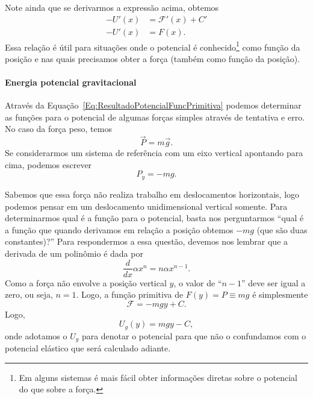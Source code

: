 Note ainda que se derivarmos a expressão acima, obtemos
\begin{align}
    - U'(x) &= \mathcal{F}'(x) + C' \\
    - U'(x) &= F(x). \label{Eq:ForcaGradPot}
\end{align}
%
Essa relação é útil para situações onde o potencial é conhecido\footnote{Em alguns sistemas é mais fácil obter informações diretas sobre o potencial do que sobre a força.} como função da posição e nas quais precisamos obter a força (também como função da posição).

\paragraph{Energia potencial gravitacional}

Através da Equação~\eqref{Eq:ResultadoPotencialFuncPrimitiva} podemos determinar as funções para o potencial de algumas forças simples através de tentativa e erro. No caso da força peso, temos
\begin{equation}
    \vec{P} = m\vec{g}.
\end{equation}
%
Se considerarmos um sistema de referência com um eixo vertical apontando para cima, podemos escrever
\begin{equation}
    P_y = -mg.
\end{equation}

Sabemos que essa força não realiza trabalho em deslocamentos horizontais, logo podemos pensar em um deslocamento unidimensional vertical somente. Para determinarmos qual é a função para o potencial, basta nos perguntarmos ``qual é a função que quando derivamos em relação a posição obtemos $-mg$ (que são duas constantes)?'' Para respondermos a essa questão, devemos nos lembrar que a derivada de um polinômio é dada por
\begin{equation}
    \frac{d}{dx} \alpha x^n = n\alpha x^{n-1}.
\end{equation}
%
Como a força não envolve a posição vertical $y$, o valor de ``$n-1$'' deve ser igual a zero, ou seja, $n=1$. Logo, a função primitiva de $F(y) = P \equiv mg$ é simplesmente
\begin{equation}
    \mathcal{F} = -mgy + C.
\end{equation}
%
Logo,
\begin{equation}
    U_g(y) = mgy - C,
\end{equation}
%
onde adotamos o $U_g$ para denotar o potencial para que não o confundamos com o potencial elástico que será calculado adiante.

